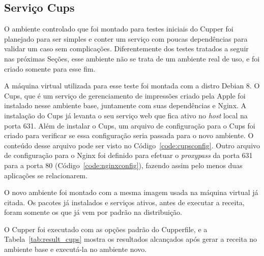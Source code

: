 \subsection{Serviço Cups}
O ambiente controlado que foi montado para testes iniciais do Cupper foi planejado
para ser simples e conter um serviço com poucas dependências para validar um caso
sem complicações. Diferentemente dos testes tratados a seguir nas próximas Seções,
esse ambiente não se trata de um ambiente real de uso, e foi criado somente para
esse fim.

A máquina virtual utilizada para esse teste foi montada com a distro Debian 8.
O Cups, que é um serviço de gerenciamento de impressões criado pela Apple foi
instalado nesse ambiente base, juntamente com suas dependências e Nginx. A instalação
do Cups já levanta o seu serviço web que fica ativo no \textit{host} local na porta 631.
Além de instalar o Cups, um arquivo de configuração para o Cups foi criado
para verificar se essa configuração seria passada para o novo ambiente. O
conteúdo desse arquivo pode ser visto no Código~\ref{code:cupsconfig}. Outro 
arquivo de configuração para o Nginx foi definido para efetuar o 
\textit{proxypass} da porta 631 para a porta 80 (Código~\ref{code:nginxconfig}), fazendo assim pelo menos duas
aplicações se relacionarem.

O novo ambiente foi montado com a mesma imagem usada na máquina virtual já citada.
Os pacotes já instalados e serviços ativos, antes de executar a receita, foram somente 
os que já vem por padrão na distribuição.

O Cupper foi executado com as opções padrão do Cupperfile, e a Tabela~\ref{tab:result_cups}
mostra os resultados alcançados após gerar a receita no ambiente base e executá-la
no ambiente novo.



